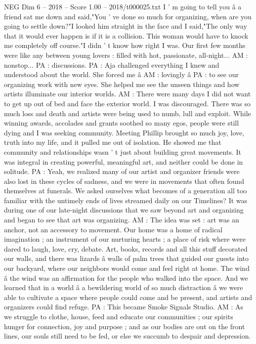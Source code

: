 \begin{textsample}{NEG Dim 6 – 2018 – Score 1.00 – 2018/t000025.txt}
I ' m going to tell you â a friend sat me down and said,"You ' ve done so much for organizing, when are you going to settle down?"I looked him straight in the face and I said,"The only way that it would ever happen is if it is a collision.
This woman would have to knock me completely off course."I didn ' t know how right I was.
Our first few months were like any between young lovers : filled with hot, passionate, all-night...
AM : nonstop...
PA : discussions.
PA : Aja challenged everything I knew and understood about the world.
She forced me â AM : lovingly â PA : to see our organizing work with new eyes.
She helped me see the unseen things and how artists illuminate our interior worlds.
AM : There were many days I did not want to get up out of bed and face the exterior world.
I was discouraged.
There was so much loss and death and artists were being used to numb, lull and exploit.
While winning awards, accolades and grants soothed so many egos, people were still dying and I was seeking community.
Meeting Phillip brought so much joy, love, truth into my life, and it pulled me out of isolation.
He showed me that community and relationships wasn ' t just about building great movements.
It was integral in creating powerful, meaningful art, and neither could be done in solitude.
PA : Yeah, we realized many of our artist and organizer friends were also lost in these cycles of sadness, and we were in movements that often found themselves at funerals.
We asked ourselves what becomes of a generation all too familiar with the untimely ends of lives streamed daily on our Timelines?
It was during one of our late-night discussions that we saw beyond art and organizing and began to see that art was organizing.
AM : The idea was set : art was an anchor, not an accessory to movement.
Our home was a home of radical imagination ; an instrument of our nurturing hearts ; a place of risk where were dared to laugh, love, cry, debate.
Art, books, records and all this stuff decorated our walls, and there was lizards â walls of palm trees that guided our guests into our backyard, where our neighbors would come and feel right at home.
The wind â the wind was an affirmation for the people who walked into the space.
And we learned that in a world â a bewildering world of so much distraction â we were able to cultivate a space where people could come and be present, and artists and organizers could find refuge.
PA : This became Smoke Signals Studio.
AM : As we struggle to clothe, house, feed and educate our communities ; our spirits hunger for connection, joy and purpose ; and as our bodies are out on the front lines, our souls still need to be fed, or else we succumb to despair and depression.

\end{textsample}
